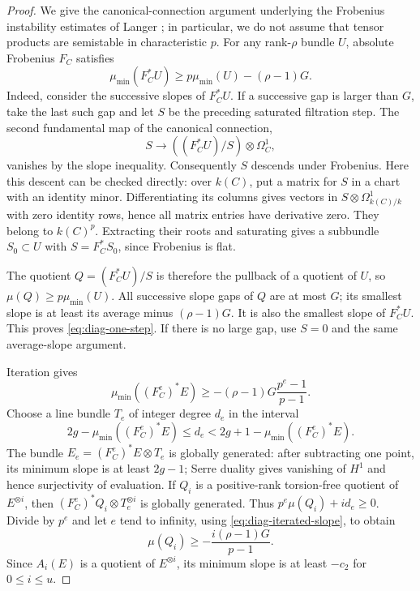 \begin{proof}
We give the canonical-connection argument underlying the Frobenius
instability estimates of Langer \cite[Section~2]{Langer2004}; in
particular, we do not assume that tensor products are semistable in
characteristic $p$. For any rank-$\rho$ bundle $U$, absolute
Frobenius $F_C$ satisfies
\begin{equation}\label{eq:diag-one-step}
 \mu_{\min}(F_C^*U)
 \ge p\mu_{\min}(U)-(\rho-1)G.
\end{equation}
Indeed, consider the successive slopes of $F_C^*U$. If a successive
gap is larger than $G$, take the last such gap and let $S$ be the
preceding saturated filtration step. The second fundamental map of
the canonical connection,
\[
 S\longrightarrow ((F_C^*U)/S)\otimes\Omega_C^1,
\]
vanishes by the slope inequality. Consequently $S$ descends under
Frobenius. Here this descent can be checked directly: over $k(C)$,
put a matrix for $S$ in a chart with an identity minor. Differentiating
its columns gives vectors in $S\otimes\Omega_{k(C)/k}^1$ with zero
identity rows, hence all matrix entries have derivative zero. They
belong to $k(C)^p$. Extracting their roots and saturating gives a
subbundle $S_0\subset U$ with $S=F_C^*S_0$, since Frobenius is flat.

The quotient $Q=(F_C^*U)/S$ is therefore the pullback of a quotient
of $U$, so $\mu(Q)\ge p\mu_{\min}(U)$. All successive slope gaps
of $Q$ are at most $G$; its smallest slope is at least its average
minus $(\rho-1)G$. It is also the smallest slope of $F_C^*U$.
This proves \eqref{eq:diag-one-step}. If there is no large gap, use
$S=0$ and the same average-slope argument.

Iteration gives
\begin{equation}\label{eq:diag-iterated-slope}
 \mu_{\min}((F_C^e)^*E)
 \ge-(\rho-1)G\frac{p^e-1}{p-1}.
\end{equation}
Choose a line bundle $T_e$ of integer degree $d_e$ in the interval
\[
 2g-\mu_{\min}((F_C^e)^*E)
 \le d_e<2g+1-\mu_{\min}((F_C^e)^*E).
\]
The bundle $E_e=(F_C^e)^*E\otimes T_e$ is globally generated:
after subtracting one point, its minimum slope is at least $2g-1$;
Serre duality gives vanishing of $H^1$ and hence surjectivity of
evaluation. If $Q_i$ is a positive-rank torsion-free quotient of
$E^{\otimes i}$, then $(F_C^e)^*Q_i\otimes T_e^{\otimes i}$
is globally generated. Thus $p^e\mu(Q_i)+i d_e\ge0$.
Divide by $p^e$ and let $e$ tend to infinity, using
\eqref{eq:diag-iterated-slope}, to obtain
\begin{equation}\label{eq:diag-tensor-lower}
 \mu(Q_i)\ge-\frac{i(\rho-1)G}{p-1}.
\end{equation}
Since $A_i(E)$ is a quotient of $E^{\otimes i}$, its minimum slope
is at least $-c_2$ for $0\le i\le u$.


\end{proof}
